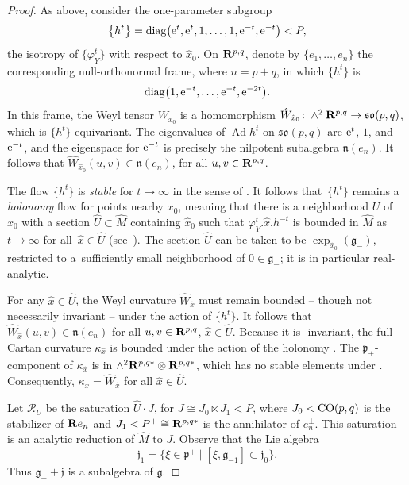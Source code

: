 \documentclass[10pt,a4paper]{amsart}
\numberwithin{equation}{section}
\theoremstyle{definition}
\newcommand{\BR}{{\bf R}}
\newcommand{\lieg}{\mathfrak{g}}
\def\g{{\mathfrak g}}
\def\p{{\mathfrak p}}
\def\n{{\mathfrak n}}
\newcommand{\so}{\mathfrak{so}}
\newcommand{\Ad}{\operatorname{Ad}}
\begin{document}
\begin{proof}
As above, consider the one-parameter subgroup
\[\bigl\{ h^t \bigr\} = {\rm diag}\bigl({\rm e}^{t}, {\rm e}^{t}, 1, \dots, 1, {\rm e}^{-t}, {\rm e}^{-t}\bigr) < P,\]
the isotropy of $\bigl\{ \varphi^t_Y \bigr\}$ with respect to $\hat{x}_0$.
On $\BR^{p,q}$, denote by $\{ e_1, \dots, e_n \}$ the corresponding null-orthonormal frame, where $n=p+q$, in which $\bigl\{h^t \bigr\}$ is
\[{\rm diag}\bigl(1, {\rm e}^{-t}, \dots, {\rm e}^{-t}, {\rm e}^{-2t}\bigr).\]
 In this frame, the Weyl tensor $W_{x_0}$ is a homomorphism $\hat{W}_{\hat{x}_0}\colon \wedge^2 \BR^{p,q} \rightarrow \so(p,q)$, which is $\{ h^t\}$-equivariant. The eigenvalues of $\Ad h^t$ on $\so(p,q)$ are ${\rm e}^t$, $1$, and ${\rm e}^{-t}$, and the eigenspace for ${\rm e}^{-t}$ is precisely the nilpotent subalgebra $\n(e_n)$. It follows that $\hat{W}_{\hat{x}_0} (u,v) \in \n(e_n)$, for all $u,v \in \BR^{p,q}$.

The flow $\bigl\{ h^t \bigr\}$ is \emph{stable} for $t \rightarrow \infty$ in the sense of \cite[Definition~4.2]{frances.degenerescence}. It follows that~$\bigl\{ h^t \bigr\}$ remains a \emph{holonomy} flow for points nearby $x_0$, meaning that there is a neighborhood $U$ of~$x_0$ with a section $\hat{U} \subset \hat{M}$ containing $\hat{x}_0$ such that $\varphi^t_Y. \hat{x} . h^{-t}$ is bounded in $\hat{M}$ as $t \rightarrow \infty$ for all~${\hat{x} \in \hat{U}}$ (see~\cite[Proposition~2.8]{cap.me.parabolictrans}). The section $\hat{U}$ can be taken to be $\exp_{\hat{x}_0}(\g_-)$, restricted to a~sufficiently small neighborhood of $0 \in \g_-$; it is in particular real-analytic.

For any $\hat{x} \in \hat{U}$, the Weyl curvature $\hat{W}_{\hat{x}}$ must remain bounded -- though not necessarily invariant -- under the action of $\bigl\{ h^t \bigr\}$. It follows that $\hat{W}_{\hat{x}} (u,v) \in \n(e_n)$ for all $u,v \in \BR^{p,q}$, $\hat{x} \in \hat{U}$.
Because it is -invariant, the full Cartan curvature $\kappa_{\hat{x}}$ is bounded under the action of the holonomy . The $\p_+$-component of $\kappa_{\hat{x}}$ is in $\wedge^2 \BR^{p,q*} \otimes \BR^{p,q*}$, which has no stable elements under . Consequently, $\kappa_{\hat{x}} = \hat{W}_{\hat{x}}$ for all $\hat{x} \in \hat{U}$.

Let $\mathcal{R}_U$ be the saturation $\hat{U} \cdot J$, for $J \cong J_0 \ltimes J_1 < P$, where $J_0 < {\rm CO}(p,q)$ is the stabilizer of $\BR e_n$ and $J_1 < P^+ \cong \BR^{p,q*}$ is the annihilator of $e_n^\perp$.
This saturation is an analytic reduction of $\hat{M}$ to $J$.
Observe that the Lie algebra{\samepage
\[\mathfrak{j}_1 = \{ \xi \in \p^+ \mid [\xi, \lieg_{-1}] \subset \mathfrak{j}_0 \}.\]
Thus $\g_- + \mathfrak{j}$ is a subalgebra of $\g$.}


\end{proof}
\end{document}
